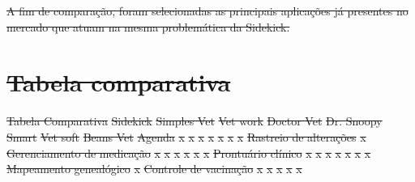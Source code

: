 \documentclass[
    12pt,               %
    openright,          %
    oneside,
    a4paper,            %
    BIBLATEX,           %
    TODO,               %
    english,            %
    brazil              %
    ]{ifsp-spo-inf-ctds}
\providecommand{\DIFdel}[1]{{\protect\color{red}\sout{#1}}}                      %
\begin{document}
\DIFdel{A fim de comparação, foram selecionadas as principais aplicações já presentes no mercado que atuam na mesma problemática da Sidekick. }%

\section{\DIFdel{Tabela comparativa}}
\addtocounter{section}{-1}%
\DIFdel{Tabela Comparativa
    }%
\DIFdel{Sidekick }%
\DIFdel{Simples Vet }%
\DIFdel{Vet work }%
\DIFdel{Doctor Vet }%
\DIFdel{Dr. Snoopy Smart }%
\DIFdel{Vet soft }%
\DIFdel{Beans Vet}%
\DIFdel{Agenda }%
\DIFdel{x }%
\DIFdel{x }%
\DIFdel{x }%
\DIFdel{x }%
\DIFdel{x }%
\DIFdel{x }%
\DIFdel{x}%
\DIFdel{Rastreio de alterações }%
\DIFdel{x }%
\DIFdel{Gerenciamento de medicação }%
\DIFdel{x }%
\DIFdel{x }%
\DIFdel{x }%
\DIFdel{x }%
\DIFdel{x }%
\DIFdel{x}%
\DIFdel{Prontuário clínico }%
\DIFdel{x }%
\DIFdel{x }%
\DIFdel{x }%
\DIFdel{x }%
\DIFdel{x }%
\DIFdel{x }%
\DIFdel{x}%
\DIFdel{Mapeamento genealógico }%
\DIFdel{x }%
\DIFdel{Controle de vacinação }%
\DIFdel{x }%
\DIFdel{x }%
\DIFdel{x }%
\DIFdel{x }%
\DIFdel{x}%
\end{document}
